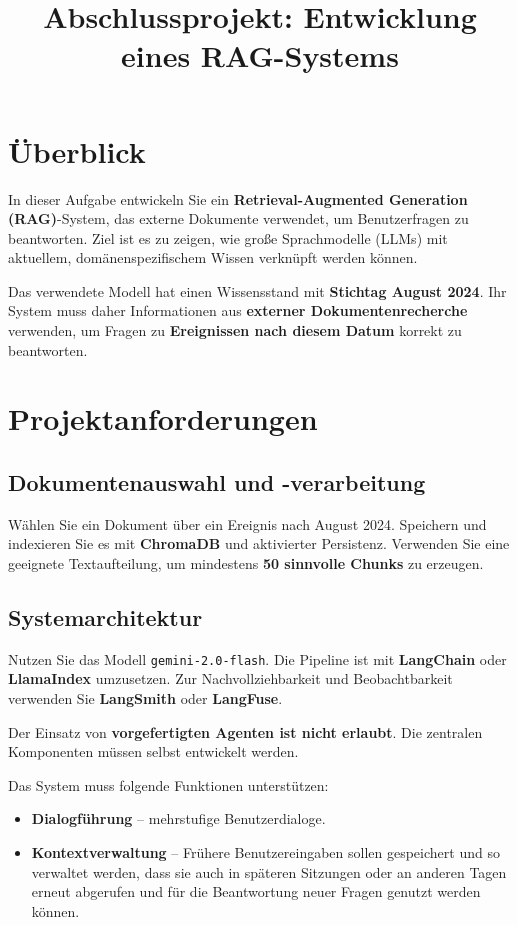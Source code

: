 \documentclass[12pt]{article}
\title{\textbf{Abschlussprojekt: Entwicklung eines RAG-Systems}}
\author{}
\date{}
\begin{document}
\maketitle

\section*{Überblick}

In dieser Aufgabe entwickeln Sie ein \textbf{Retrieval-Augmented Generation (RAG)}-System, das externe Dokumente verwendet, um Benutzerfragen zu beantworten. Ziel ist es zu zeigen, wie große Sprachmodelle (LLMs) mit aktuellem, domänenspezifischem Wissen verknüpft werden können.

Das verwendete Modell hat einen Wissensstand mit \textbf{Stichtag August 2024}. Ihr System muss daher Informationen aus \textbf{externer Dokumentenrecherche} verwenden, um Fragen zu \textbf{Ereignissen nach diesem Datum} korrekt zu beantworten.

\section*{Projektanforderungen}

\subsection*{Dokumentenauswahl und -verarbeitung}
Wählen Sie ein Dokument über ein Ereignis nach August 2024. Speichern und indexieren Sie es mit \textbf{ChromaDB} und aktivierter Persistenz. Verwenden Sie eine geeignete Textaufteilung, um mindestens \textbf{50 sinnvolle Chunks} zu erzeugen.

\subsection*{Systemarchitektur}
Nutzen Sie das Modell \texttt{gemini-2.0-flash}. Die Pipeline ist mit \textbf{LangChain} oder \textbf{LlamaIndex} umzusetzen. Zur Nachvollziehbarkeit und Beobachtbarkeit verwenden Sie \textbf{LangSmith} oder \textbf{LangFuse}.

Der Einsatz von \textbf{vorgefertigten Agenten ist nicht erlaubt}. Die zentralen Komponenten müssen selbst entwickelt werden.

Das System muss folgende Funktionen unterstützen:
\begin{itemize}[noitemsep]
  \item \textbf{Dialogführung} – mehrstufige Benutzerdialoge.
  \item \textbf{Kontextverwaltung} – Frühere Benutzereingaben sollen gespeichert und so verwaltet werden, dass sie auch in späteren Sitzungen oder an anderen Tagen erneut abgerufen und für die Beantwortung neuer Fragen genutzt werden können.
\end{itemize}
\end{document}
